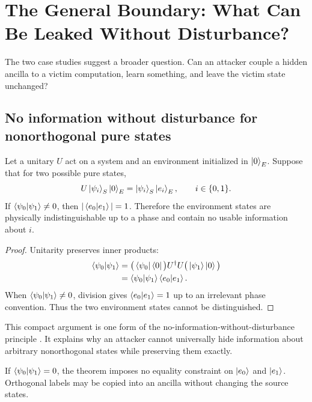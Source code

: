 \section{The General Boundary: What Can Be Leaked Without Disturbance?}
\label{sec:information-boundary}

The two case studies suggest a broader question. Can an attacker couple a hidden
ancilla to a victim computation, learn something, and leave the victim state
unchanged?

\subsection{No information without disturbance for nonorthogonal pure states}

\begin{theorem}
Let a unitary $U$ act on a system and an environment initialized in
$\ket{0}_E$. Suppose that for two possible pure states,
\begin{equation}
  U\ket{\psi_i}_S\ket{0}_E
  =\ket{\psi_i}_S\ket{e_i}_E,
  \qquad i\in\{0,1\}.
  \label{eq:nondisturbing-map}
\end{equation}
If $\braket{\psi_0|\psi_1}\neq 0$, then
$|\braket{e_0|e_1}|=1$. Therefore the environment states are physically
indistinguishable up to a phase and contain no usable information about $i$.
\end{theorem}

\begin{proof}
Unitarity preserves inner products:
\begin{align}
  \braket{\psi_0|\psi_1}
  &=\big(\bra{\psi_0}\bra{0}\big)
    U^\dagger U
    \big(\ket{\psi_1}\ket{0}\big)\\
  &=\braket{\psi_0|\psi_1}\braket{e_0|e_1}.
\end{align}
When $\braket{\psi_0|\psi_1}\neq 0$, division gives
$\braket{e_0|e_1}=1$ up to an irrelevant phase convention. Thus the two
environment states cannot be distinguished.
\end{proof}

This compact argument is one form of the no-information-without-disturbance
principle \cite{fuchs1996information,koashi2002operations}. It explains why an
attacker cannot universally hide information about arbitrary nonorthogonal
states while preserving them exactly.

\begin{corollary}
If $\braket{\psi_0|\psi_1}=0$, the theorem imposes no equality constraint on
$\ket{e_0}$ and $\ket{e_1}$. Orthogonal labels may be copied into an ancilla
without changing the source states.
\end{corollary}

